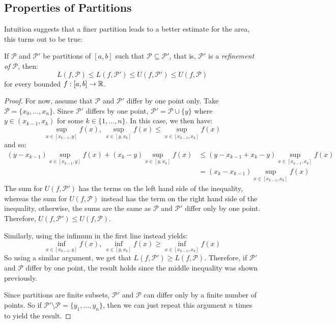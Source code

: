 \documentclass[../main.tex]{subfiles}
\begin{document}
\subsection{Properties of Partitions}
Intuition suggests that a finer partition leads to a better estimate for the area, this turns out to be true:
\begin{lemma}
  If $\mathcal{P}$ and $\mathcal{P}'$ be partitions of $[a, b]$ such that $\mathcal{P} \subseteq \mathcal{P}'$, that is, $\mathcal{P}'$ is a \textit{refinement of $\mathcal{P}$}, then:
  \label{refinementInequality}
  \[
    L(f, \mathcal{P}) \leq L(f, \mathcal{P'}) \leq U(f, \mathcal{P}') \leq U(f, \mathcal{P})
  \]
  for every bounded $f: [a, b] \to \mathbb{R}$.
\end{lemma}
\begin{proof}
  For now, assume that $\mathcal{P}$ and $\mathcal{P}'$ differ by one point only.
  Take $\mathcal{P} = \{x_0, \ldots, x_n\}$.
  Since $\mathcal{P}'$ differs by one point, $\mathcal{P}' = \mathcal{P} \cup \{y\}$ where $y \in (x_{k - 1}, x_k)$ for some $k \in \{1, \ldots, n\}$.
  In this case, we then have:
  \[
    \sup_{x \in [x_{k - 1}, y]} f(x),\ \sup_{x \in [y, x_k]} f(x) \leq \sup_{x \in [x_{k - 1}, x_k]} f(x)
  \]
  and so:
  \begin{align*}
    (y - x_{k - 1})\sup_{x \in [x_{k - 1}, y]} f(x) + (x_k - y) \sup_{x \in [y, x_k]} f(x) &\leq (y - x_{k - 1}+ x_k - y) \sup_{x \in [x_{k - 1}, x_k]} f(x) \\
                                                                                           &= (x_k - x_{k - 1}) \sup_{x \in [x_{k - 1}, x_k]}  f(x)
  \end{align*}
  The sum for $U(f, \mathcal{P}')$ has the terms on the left hand side of the inequality, whereas the sum for $U(f, \mathcal{P})$ instead has the term on the right hand side of the inequality, otherwise, the sums are the same as $\mathcal{P}$ and $\mathcal{P}'$ differ only by one point.
  Therefore, $U(f, \mathcal{P}') \leq U(f, \mathcal{P})$.

  Similarly, using the infimum in the first line instead yields:
  \[
    \inf_{x \in [x_{k - 1}, y]} f(x),\ \inf_{x \in [y, x_k]} f(x) \geq \inf_{x \in [x_{k - 1}, x_k]} f(x)
  \]
  So using a similar argument, we get that $L(f, \mathcal{P}') \geq L(f, \mathcal{P})$.
  Therefore, if $\mathcal{P}'$ and $\mathcal{P}$ differ by one point, the result holds since the middle inequality was shown previously.

  Since partitions are finite subsets, $\mathcal{P}'$ and $\mathcal{P}$ can differ only by a finite number of points.
  So if $\mathcal{P}' \setminus \mathcal{P} = \{y_1, \ldots, y_n\}$, then we can just repeat this argument $n$ times to yield the result.
\end{proof}
\end{document}
